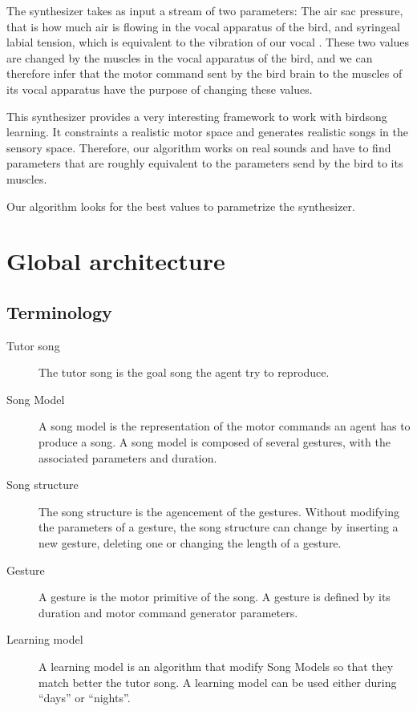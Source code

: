 \documentclass[a4paper]{report}
\begin{document}
The synthesizer takes as input a stream of two parameters: The air sac pressure,
that is how much air is flowing in the vocal apparatus of the bird, and
syringeal labial tension, which is equivalent to the vibration of our vocal
. These two values are changed by the muscles in the vocal
apparatus of the bird, and we can therefore infer that the motor command sent by
the bird brain to the muscles of its vocal apparatus have the purpose of
changing these values.

This synthesizer provides a very interesting framework to work with birdsong
learning. It constraints a realistic motor space and generates realistic songs
in the sensory space. Therefore, our algorithm works on real sounds and have to
find parameters that are roughly equivalent to the parameters send by the bird
to its muscles.


Our algorithm looks for the best values to parametrize the synthesizer.


\section{Global architecture}


\subsection{Terminology}

\begin{description}
  \item[Tutor song] The tutor song is the goal song the agent try to reproduce.
  \item[Song Model] A song model is the representation of the motor commands an
  agent has to produce a song. A song model is composed of several gestures,
  with the associated parameters and duration.
  \item[Song structure] The song structure is the agencement of the gestures.
  Without modifying the parameters of a gesture, the song structure can change
  by inserting a new gesture, deleting one or changing the length of a gesture.
  \item[Gesture] A gesture is the motor primitive of the song. A gesture
  is defined by its duration and motor command generator parameters.
  \item[Learning model] A learning model is an algorithm that modify Song Models
  so that they match better the tutor song. A learning model can be used either
  during ``days'' or ``nights''.
\end{description}
\end{document}
